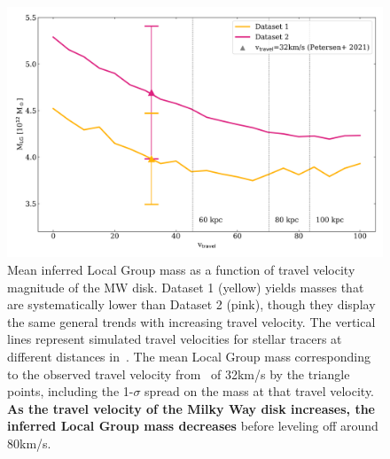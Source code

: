 \documentclass[twocolumn]{aastex631}
\begin{document}
\begin{figure}[htb]
    \centering
    \includegraphics[width=\columnwidth]{analyze-runs-MvV.png}
    \caption{\label{fig:mvsv} Mean inferred Local Group mass as a function of travel velocity magnitude of the MW disk. Dataset 1 (yellow) yields masses that are systematically lower than Dataset 2 (pink), though they display the same general trends with increasing travel velocity. The vertical lines represent simulated travel velocities for stellar tracers at different distances in~\cite{Garavito-Camargo2021b}.
    The mean Local Group mass corresponding to the observed travel velocity from~\cite{Petersen2021} of 32km/s by the triangle points, including the 1-$\sigma$ spread on the mass at that travel velocity. \textbf{As the travel velocity of the Milky Way disk increases, the inferred Local Group mass decreases} before leveling off around 80km/s.
    }
  \end{figure}
\end{document}
